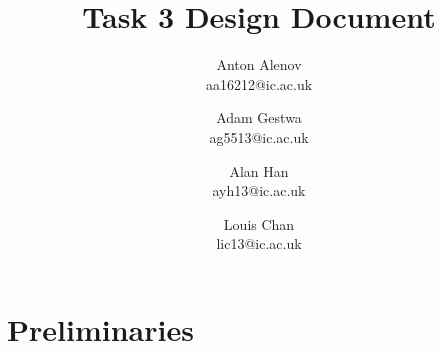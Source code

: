 \documentclass[11pt]{article}
\begin{document}
\title{Task 3 Design Document}
\author{Anton Alenov\\aa16212@ic.ac.uk \and Adam Gestwa\\ag5513@ic.ac.uk \and Alan Han\\ayh13@ic.ac.uk \and Louis Chan\\lic13@ic.ac.uk}

\maketitle

\section*{Preliminaries}



\newpage

\newpage

\end{document}
